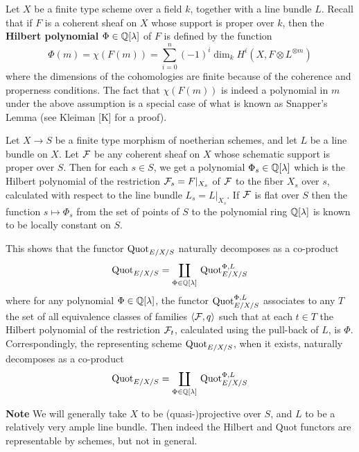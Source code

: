 \medskip


\begin{definition}\label{nhq-hilbert-polynomial}
Let $X$ be a finite type scheme over
a field $k$, together with a line bundle $L$.
Recall that if $F$ is a coherent sheaf on
$X$ whose support is proper over $k$, then
the \textbf{Hilbert polynomial} ${\Phi}\in \mathbb{Q}[\lambda]$ of $F$ is defined by
the function
$${\Phi}(m) = \chi(F(m)) =
\sum_{i=0}^n (-1)^i \dim_k H^i(X, F\otimes L^{\otimes m})$$
where the dimensions of the cohomologies are finite because of the
coherence and properness conditions. The fact that $\chi(F(m))$
is indeed a polynomial in $m$ under the above assumption is a special
case of what is known as Snapper's Lemma (see Kleiman [K] for a proof).



Let $X\to S$ be a finite type morphism of noetherian schemes,
and let $L$ be a line bundle on $X$. Let $\mathcal{F}$
be any coherent sheaf on
$X$ whose schematic support is proper over $S$. Then for each $s\in S$,
we get a polynomial ${\Phi}_s \in  \mathbb{Q}[\lambda]$
which is the Hilbert polynomial of
the restriction $\mathcal{F}_s = F|_{X_s}$ of $\mathcal{F}$ to the fiber $X_s$ over $s$,
calculated with respect to the line bundle $L_s = L|_{X_s}$.
If $\mathcal{F}$ is flat over $S$ then the function $s\mapsto {\Phi}_s$
from the set of points of $S$ to the polynomial ring $\mathbb{Q}[\lambda]$ is
known to be locally constant on $S$.


This shows that the functor $\operatorname{Quot}_{E/X/S}$ naturally decomposes
as a co-product
$$\operatorname{Quot}_{E/X/S} = \coprod_{{\Phi}\in \mathbb{Q}[\lambda]}\, \operatorname{Quot}_{E/X/S}^{\Phi,L}$$
where for any polynomial ${\Phi}\in \mathbb{Q}[\lambda]$, the functor
$\operatorname{Quot}_{E/X/S}^{\Phi,L}$ associates
to any $T$ the set of all equivalence classes of
families $\langle \mathcal{F},q \rangle$ such that at each $t\in T$ the
Hilbert polynomial of the restriction $\mathcal{F}_t$, calculated
using the pull-back of $L$, is ${\Phi}$. Correspondingly,
the representing scheme  $\operatorname{Quot}_{E/X/S}$, when it exists, naturally decomposes
as a co-product
$$\operatorname{Quot}_{E/X/S} = \coprod_{{\Phi}\in \mathbb{Q}[\lambda]}\, \operatorname{Quot}_{E/X/S}^{\Phi,L}$$

\textbf{Note }
We will generally take $X$ to be (quasi-)projective over $S$,
and $L$ to be a relatively very ample line bundle. Then indeed
the Hilbert and Quot functors are representable by schemes,
but not in general.
\end{definition}




